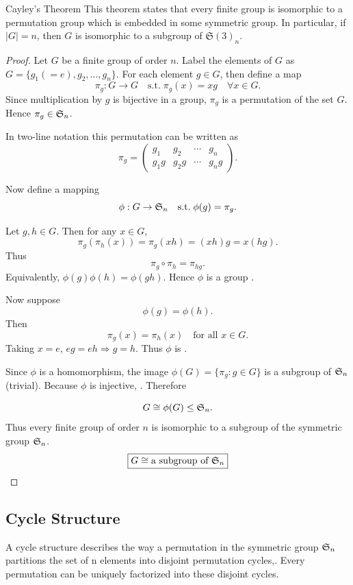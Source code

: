 \documentclass[a4paper,12pt]{article}
\theoremstyle{definition}
\begin{document}
\begin{stkynote}[cyan]{Cayley's Theorem }
    This theorem states that every finite group is isomorphic to a permutation group which is embedded in some symmetric group. In particular, if $|G| = n$, then $G$ is isomorphic to a subgroup of $\mathfrak{S}(3)_n$.

    \begin{proof}
            Let $G$ be a finite group of order $n$. Label the elements of $G$ as $  G = \{ g_1(=e), g_2, \ldots, g_n \}.$ For each element $g \in G$, then define a map
    \[
    \pi_g : G \rightarrow G \quad\text{s.t.}\;  \pi_g(x) = xg \quad \forall x \in G.
    \]
    Since multiplication by $g$ is bijective in a group, $\pi_g$ is a permutation
    of the set $G$. Hence $\pi_g \in \mathfrak{S}_n$.

    In two-line notation this permutation can be written as
    \[\pi_g =
    \begin{pmatrix}
    g_1 & g_2 & \cdots & g_n \\
    g_1 g & g_2 g & \cdots & g_n g
    \end{pmatrix}.\]

    Now define a mapping
    \[
    \phi : G \rightarrow \mathfrak{S}_n \quad \text{s.t.} \;  \phi(g) = \pi_g.
    \]
    
    Let $g,h \in G$. Then for any $x \in G$,
    \[
    \pi_g(\pi_h(x)) = \pi_g(xh) = (xh)g = x(hg).
    \]
    Thus
    \[
    \pi_g \circ \pi_h = \pi_{hg}.
    \]
    Equivalently, $\phi(g)\phi(h) = \phi(gh).$ Hence $\phi$ is a group .

    Now suppose
    \[
    \phi(g) = \phi(h).
    \]
    Then
    \[
    \pi_g(x) = \pi_h(x) \quad \text{for all } x \in G.
    \]
    Taking $x = e$, $    eg = eh \Rightarrow g = h.$ Thus $\phi$ is .

    Since $\phi$ is a homomorphism, the image $ \phi(G) = \{ \pi_g : g \in G \}$ is a subgroup of $\mathfrak{S}_n$ (trivial). Because $\phi$ is injective, .
    Therefore

    \[
    G \cong \phi(G) \leq \mathfrak{S}_n.
    \]
    Thus every finite group of order $n$ is isomorphic to a subgroup of the
    symmetric group $\mathfrak{S}_n$.
    \[
    \boxed{G \cong \text{a subgroup of } \mathfrak{S}_n}
    \]
    \end{proof}
\end{stkynote}
\subsection{Cycle Structure}
A cycle structure describes the way a permutation in the symmetric group $\mathfrak{S}_n$ partitions the set of n elements into disjoint permutation cycles,. Every permutation can be uniquely factorized into these disjoint cycles.
\end{document}
